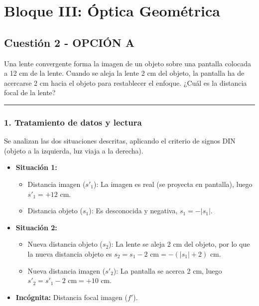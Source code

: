 \newpage

\section{Bloque III: Óptica Geométrica}
\label{sec:optica_2004_sep_cv}

\subsection{Cuestión 2 - OPCIÓN A}
\label{subsec:3A_2004_sep_cv}

\begin{cajaenunciado}
Una lente convergente forma la imagen de un objeto sobre una pantalla colocada a 12 cm de la lente. Cuando se aleja la lente 2 cm del objeto, la pantalla ha de acercarse 2 cm hacia el objeto para restablecer el enfoque. ¿Cuál es la distancia focal de la lente?
\end{cajaenunciado}
\hrule

\subsubsection*{1. Tratamiento de datos y lectura}
Se analizan las dos situaciones descritas, aplicando el criterio de signos DIN (objeto a la izquierda, luz viaja a la derecha).
\begin{itemize}
    \item \textbf{Situación 1:}
        \begin{itemize}
            \item Distancia imagen ($s'_1$): La imagen es real (se proyecta en pantalla), luego $s'_1 = +12 \text{ cm}$.
            \item Distancia objeto ($s_1$): Es desconocida y negativa, $s_1 = -|s_1|$.
        \end{itemize}
    \item \textbf{Situación 2:}
        \begin{itemize}
            \item Nueva distancia objeto ($s_2$): La lente se aleja 2 cm del objeto, por lo que la nueva distancia objeto es $s_2 = s_1 - 2 \text{ cm} = -(|s_1| + 2) \text{ cm}$.
            \item Nueva distancia imagen ($s'_2$): La pantalla se acerca 2 cm, luego $s'_2 = s'_1 - 2 \text{ cm} = +10 \text{ cm}$.
        \end{itemize}
    \item \textbf{Incógnita:} Distancia focal imagen ($f'$).
\end{itemize}

